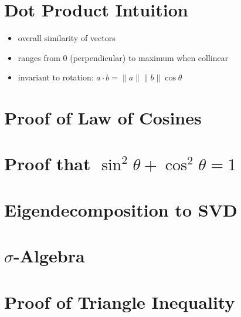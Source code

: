 \documentclass[a4, 12pt]{article}
\newcommand{\no}[1]{\lVert #1 \rVert}
\begin{document}
\section{Dot Product Intuition}
\begin{itemize}
    \item overall similarity of vectors
    \item ranges from 0 (perpendicular) to maximum when collinear
    \item invariant to rotation: $a \cdot b = \no{a}\no{b} \cos \theta$
\end{itemize}

\section{Proof of Law of Cosines}


\section{Proof that $\sin^2 \theta + \cos^2 \theta = 1$}


\section{Eigendecomposition to SVD}


\section{$\sigma$-Algebra}


\section{Proof of Triangle Inequality}

\newpage
\end{document}
